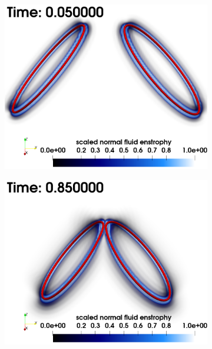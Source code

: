 \documentclass[%
 reprint,
 amsmath,amssymb,
 aps,
 prl,
]{revtex4-2}
\begin{document}
\begin{figure}[t]
	\centering
	\begin{subfigure}[b]{0.24\textwidth}
		\centering
		\includegraphics*[width=\textwidth]{snap-1.png}
	\end{subfigure}
	\begin{subfigure}[b]{0.24\textwidth}
		\centering
		\includegraphics*[width=\textwidth]{snap-2.png}
	\end{subfigure}
    \begin{subfigure}[b]{0.24\textwidth}
		\centering

\end{subfigure}
\end{figure}
\end{document}

